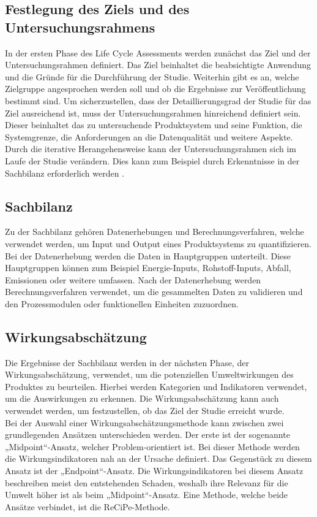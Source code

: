 \documentclass[12pt]{article}
\begin{document}
\subsection{Festlegung des Ziels und des Untersuchungsrahmens}
In der ersten Phase des Life Cycle Assessments werden zunächst das Ziel und der Untersuchungsrahmen definiert. Das Ziel beinhaltet die beabsichtigte Anwendung und die Gründe für die Durchführung der Studie. Weiterhin gibt es an, welche Zielgruppe angesprochen werden soll und ob die Ergebnisse zur Veröffentlichung bestimmt sind. Um sicherzustellen, dass der Detaillierungsgrad der Studie für das Ziel ausreichend ist, muss der Untersuchungsrahmen hinreichend definiert sein. Dieser beinhaltet das zu untersuchende Produktsystem und seine Funktion, die Systemgrenze, die Anforderungen an die Datenqualität und weitere Aspekte. Durch die iterative Herangehensweise kann der Untersuchungsrahmen sich im Laufe der Studie verändern. Dies kann zum Beispiel durch Erkenntnisse in der Sachbilanz erforderlich werden .

\subsection{Sachbilanz}
Zu der Sachbilanz gehören Datenerhebungen und Berechnungsverfahren, welche verwendet werden, um Input und Output eines Produktsystems zu quantifizieren. Bei der Datenerhebung werden die Daten in Hauptgruppen unterteilt. Diese Hauptgruppen können zum Beispiel Energie-Inputs, Rohstoff-Inputs, Abfall, Emissionen oder weitere umfassen. Nach der Datenerhebung werden Berechnungsverfahren verwendet, um die gesammelten Daten zu validieren und den Prozessmodulen oder funktionellen Einheiten zuzuordnen.

\subsection{Wirkungsabschätzung}
Die Ergebnisse der Sachbilanz werden in der nächsten Phase, der Wirkungsabschätzung, verwendet, um die potenziellen Umweltwirkungen des Produktes zu beurteilen. Hierbei werden Kategorien und Indikatoren verwendet, um die Auswirkungen zu erkennen. Die Wirkungsabschätzung kann auch verwendet werden, um festzustellen, ob das Ziel der Studie erreicht wurde.\\
Bei der Auswahl einer Wirkungsabschätzungsmethode kann zwischen zwei grundlegenden Ansätzen unterschieden werden. Der erste ist der sogenannte „Midpoint“-Ansatz, welcher Problem-orientiert ist. Bei dieser Methode werden die Wirkungsindikatoren nah an der Ursache definiert. Das Gegenstück zu diesem Ansatz ist der „Endpoint“-Ansatz. Die Wirkungsindikatoren bei diesem Ansatz beschreiben meist den entstehenden Schaden, weshalb ihre Relevanz für die Umwelt höher ist als beim „Midpoint“-Ansatz. Eine Methode, welche beide Ansätze verbindet, ist die ReCiPe-Methode.
\end{document}
